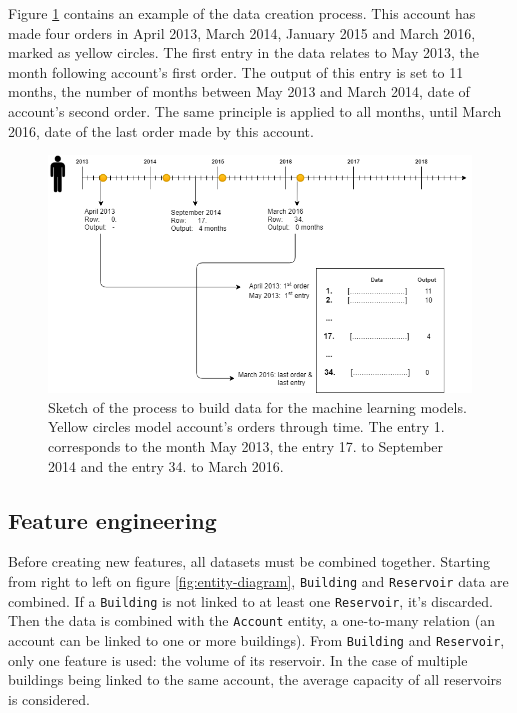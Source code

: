 Figure \ref{fig:data-build-example} contains an example of the data creation process. This account has made four orders in April 2013, March 2014, January 2015 and March 2016, marked as yellow circles. The first entry in the data relates to May 2013, the month following account's first order. The output of this entry is set to 11 months, the number of months between May 2013 and March 2014, date of account's second order. The same principle is applied to all months, until March 2016, date of the last order made by this account.

\begin{figure}[h]
    \includegraphics[width=15cm]{images/data-build-ml-example_3.png}
    \caption[Process to build data for machine learning]{Sketch of the process to build data for the machine learning models. Yellow circles model account's orders through time. The entry 1. corresponds to the month May 2013, the entry 17. to September 2014 and the entry 34. to March 2016.}
    \label{fig:data-build-example}
\end{figure}


\subsection{Feature engineering}\label{sec:ml-features}

Before creating new features, all datasets must be combined together. Starting from right to left on figure \ref{fig:entity-diagram}, \texttt{Building} and \texttt{Reservoir} data are combined. If a \texttt{Building} is not linked to at least one \texttt{Reservoir}, it's discarded. Then the data is combined with the \texttt{Account} entity, a one-to-many relation (an account can be linked to one or more buildings). From \texttt{Building} and \texttt{Reservoir}, only one feature is used: the volume of its reservoir. In the case of multiple buildings being linked to the same account, the average capacity of all reservoirs is considered.

